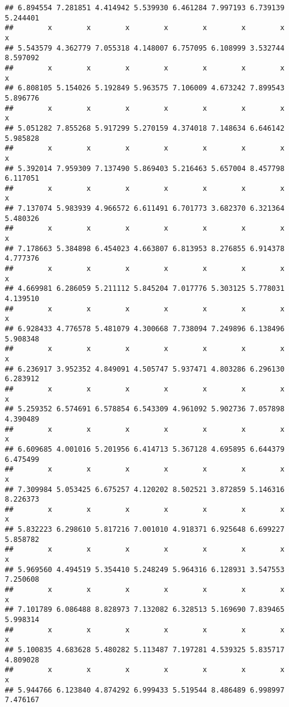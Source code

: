 \documentclass[a4paper,10pt]{book}\usepackage[]{graphicx}\usepackage[]{color}
\makeatletter
\newenvironment{kframe}{%
 \def\at@end@of@kframe{}%
 \ifinner\ifhmode%
  \def\at@end@of@kframe{\end{minipage}}%
  \begin{minipage}{\columnwidth}%
 \fi\fi%
 \def\FrameCommand##1{\hskip\@totalleftmargin \hskip-\fboxsep
 \colorbox{shadecolor}{##1}\hskip-\fboxsep
     \hskip-\linewidth \hskip-\@totalleftmargin \hskip\columnwidth}%
 \MakeFramed {\advance\hsize-\width
   \@totalleftmargin\z@ \linewidth\hsize
   \@setminipage}}%
 {\par\unskip\endMakeFramed%
 \at@end@of@kframe}
\newenvironment{knitrout}{}{} %
\makeatother
\begin{document}
\begin{knitrout}
\begin{kframe}
\begin{verbatim}
## 6.894554 7.281851 4.414942 5.539930 6.461284 7.997193 6.739139 5.244401 
##        x        x        x        x        x        x        x        x 
## 5.543579 4.362779 7.055318 4.148007 6.757095 6.108999 3.532744 8.597092 
##        x        x        x        x        x        x        x        x 
## 6.808105 5.154026 5.192849 5.963575 7.106009 4.673242 7.899543 5.896776 
##        x        x        x        x        x        x        x        x 
## 5.051282 7.855268 5.917299 5.270159 4.374018 7.148634 6.646142 5.985828 
##        x        x        x        x        x        x        x        x 
## 5.392014 7.959309 7.137490 5.869403 5.216463 5.657004 8.457798 6.117051 
##        x        x        x        x        x        x        x        x 
## 7.137074 5.983939 4.966572 6.611491 6.701773 3.682370 6.321364 5.480326 
##        x        x        x        x        x        x        x        x 
## 7.178663 5.384898 6.454023 4.663807 6.813953 8.276855 6.914378 4.777376 
##        x        x        x        x        x        x        x        x 
## 4.669981 6.286059 5.211112 5.845204 7.017776 5.303125 5.778031 4.139510 
##        x        x        x        x        x        x        x        x 
## 6.928433 4.776578 5.481079 4.300668 7.738094 7.249896 6.138496 5.908348 
##        x        x        x        x        x        x        x        x 
## 6.236917 3.952352 4.849091 4.505747 5.937471 4.803286 6.296130 6.283912 
##        x        x        x        x        x        x        x        x 
## 5.259352 6.574691 6.578854 6.543309 4.961092 5.902736 7.057898 4.390489 
##        x        x        x        x        x        x        x        x 
## 6.609685 4.001016 5.201956 6.414713 5.367128 4.695895 6.644379 6.475499 
##        x        x        x        x        x        x        x        x 
## 7.309984 5.053425 6.675257 4.120202 8.502521 3.872859 5.146316 8.226373 
##        x        x        x        x        x        x        x        x 
## 5.832223 6.298610 5.817216 7.001010 4.918371 6.925648 6.699227 5.858782 
##        x        x        x        x        x        x        x        x 
## 5.969560 4.494519 5.354410 5.248249 5.964316 6.128931 3.547553 7.250608 
##        x        x        x        x        x        x        x        x 
## 7.101789 6.086488 8.828973 7.132082 6.328513 5.169690 7.839465 5.998314 
##        x        x        x        x        x        x        x        x 
## 5.100835 4.683628 5.480282 5.113487 7.197281 4.539325 5.835717 4.809028 
##        x        x        x        x        x        x        x        x 
## 5.944766 6.123840 4.874292 6.999433 5.519544 8.486489 6.998997 7.476167 

\end{verbatim}
\end{kframe}
\end{knitrout}
\end{document}
